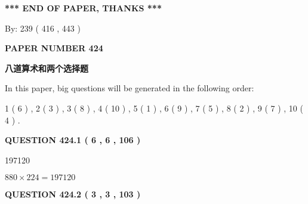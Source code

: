 \documentclass{ctexart}
\begin{document}
   
 \vspace{0.2in}
 
   
   
   
   
\vspace{1.0in} 
{\textbf{\large{ *** END OF PAPER, THANKS *** }}} 
   
   
\hspace{1.0in} By: 
 239 ( 416 ,  443 )
   
   
   
   
\newpage 
\setcounter{page}{ 
   424001 } 
   
   
   
   
 {\textbf{ \Large{ PAPER NUMBER  424  }}}
   
   
\vspace{0.2in}
   
   
   
   
   
   
 \vspace{0.2in}
{\LARGE {\textbf{ 八道算术和两个选择题}}}
   
   
   
\vspace{0.2in}
   
In this paper, big questions will be generated in the following order: 
   
   
   1 ( 6 )
 ,
   2 ( 3 )
 ,
   3 ( 8 )
 ,
   4 ( 10 )
 ,
   5 ( 1 )
 ,
   6 ( 9 )
 ,
   7 ( 5 )
 ,
   8 ( 2 )
 ,
   9 ( 7 )
 ,
   10 ( 4 )
 .
  
\vspace{0.2in}
  
{\textbf{\Large{QUESTION
424.1 
 ( 6 , 6 , 106 )
}}}
  
  
 
 
\noindent{}

197120
 
 
 
 
\noindent{}

$ %
880 \times  %
224=   %
197120$
 
 
  
\vspace{0.2in}
  
{\textbf{\Large{QUESTION
424.2 
 ( 3 , 3 , 103 )
}}}
  
\end{document}

